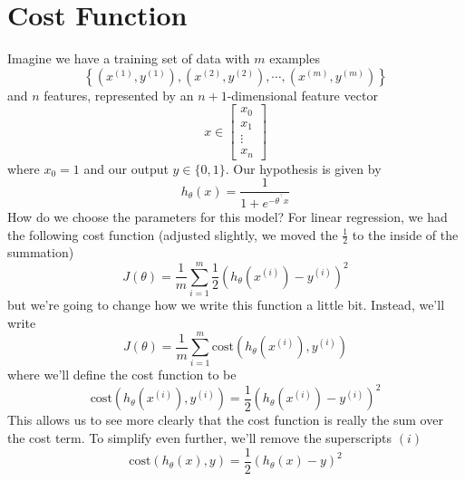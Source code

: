 \section{Cost Function}
Imagine we have a training set of data with $m$ examples
$$
\left\{ \left(x^{\left(1\right)}, y^{\left(1\right)}\right), \left(x^{\left(2\right)}, y^{\left(2\right)}\right), \cdots, \left(x^{\left(m\right)}, y^{\left(m\right)}\right) \right\}
$$
and $n$ features, represented by an $n+1$-dimensional feature vector
$$
x \in \left[\begin{array}{c} x_0 \\ x_1 \\ \vdots \\ x_n \end{array}\right]
$$
where $x_0 = 1$ and our output $y \in \{0, 1\}$. Our hypothesis is given by
\begin{equation}
h_\theta\left(x\right) = \frac{1}{1 + e^{-\theta^{{}^\intercal}x}}
\end{equation}
How do we choose the parameters for this model? For linear regression, we had the following cost function (adjusted slightly, we moved the $\tfrac{1}{2}$ to the inside of the summation)
\begin{equation}
J\left(\theta\right) = \frac{1}{m} \sum_{i=1}^m \frac{1}{2} \left(		h_\theta\left(x^{\left(i\right)}\right) - y^{\left(i\right)}	\right)^2
\end{equation}
but we're going to change how we write this function a little bit. Instead, we'll write
\begin{equation}
J\left(\theta\right) = \frac{1}{m} \sum_{i=1}^m \text{cost}\left(	h_\theta\left(x^{\left(i\right)}\right), y^{\left(i\right)}\right)
\end{equation}
where we'll define the cost function to be
\begin{equation}
\text{cost}\left(	h_\theta\left(x^{\left(i\right)}\right), y^{\left(i\right)}\right) = \frac{1}{2} \left(h_\theta\left(x^{\left(i\right)}\right) - y^{\left(i\right)}	\right)^2
\end{equation}
This allows us to see more clearly that the cost function is really the sum over the cost term. To simplify even further, we'll remove the superscripts $\left(i\right)$
\begin{equation}
\text{cost}\left(h_\theta\left(x\right), y\right) = \frac{1}{2} \left(	h_\theta\left(x\right) - y \right)^2
\end{equation}


